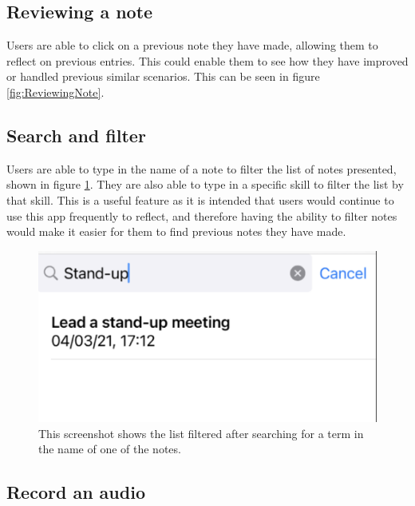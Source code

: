 \documentclass{l4proj}
\begin{document}
\subsection{Reviewing a note}

Users are able to click on a previous note they have made, allowing them to reflect on previous entries. This could enable them to see how they have improved or handled previous similar scenarios. This can be seen in figure \ref{fig:ReviewingNote}.

\subsection{Search and filter}

Users are able to type in the name of a note to filter the list of notes presented, shown in figure \ref{fig:SearchFilter}. They are also able to type in a specific skill to filter the list by that skill. This is a useful feature as it is intended that users would continue to use this app frequently to reflect, and therefore having the ability to filter notes would make it easier for them to find previous notes they have made. 

\begin{figure}
    \centering
    \includegraphics[scale=0.4]{images/SearchFilter.pdf}    
    \caption{This screenshot shows the list filtered after searching for a term in the name of one of the notes.}
    \label{fig:SearchFilter} 
\end{figure}

\subsection{Record an audio}
\end{document}
